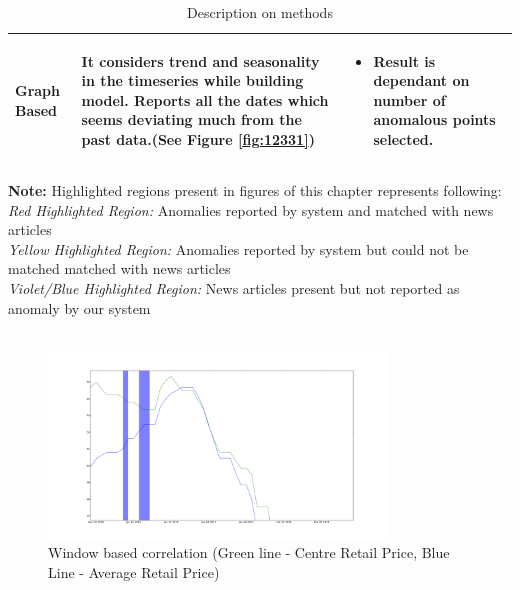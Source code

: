 \begin{table}[H]
{\begin{tabular}{|L{3cm} | L{5cm} | L{8cm}|}
Graph Based                           & It considers trend and seasonality in the timeseries while building model. Reports all the dates which seems deviating much from the past data.(See Figure \ref{fig:12331})                                                                                                     & \begin{itemize}
                                                                                                                                                                                                                                                                                                                  \item Result is dependant on number of anomalous points selected. 
                                                                                                                                                                                                                                                                                                                 \end{itemize}                                                                                                                                                                                                                                                                                                                              \\ \hline
	\end{tabular}}
	\caption{Description on methods}
	\label{table:MethodDescription}
\end{table}

\textbf{Note:} Highlighted regions present in figures of this chapter represents following:\\
\textit{Red Highlighted Region:} Anomalies reported by system and matched with news articles\\
\textit{Yellow Highlighted Region:} Anomalies reported by system but could not be matched matched with news articles\\
\textit{Violet/Blue Highlighted Region:} News articles present but not reported as anomaly by our system\\
\\

\begin{figure}[H]
\centering
\includegraphics[width=0.8\textwidth]{graphs/20110106_0108.png}
\caption{Window based correlation (Green line - Centre Retail Price, Blue Line - Average Retail Price)}
\label{fig:20110106_0108}
\end{figure}

